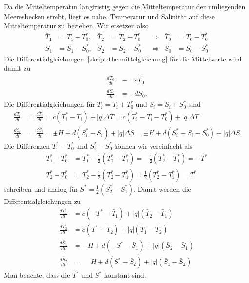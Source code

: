 Da die Mitteltemperatur langfristig gegen die Mitteltemperatur der
umliegenden Meeresbecken strebt, liegt es nahe, Temperatur und
Salinität auf diese Mitteltemperatur zu beziehen.
Wir ersetzen also
\begin{equation}
\begin{aligned}
\bar T_1&=T_1-T_0^*,
&
\bar T_2&=T_2-T_0^*
&&\Rightarrow&
\bar T_0&=T_0-T_0^*
\\
\bar S_1&=S_1-S_0^*,
&
\bar S_2&=S_2-S_0^*
&&\Rightarrow&
\bar S_0&=S_0-S_0^*
\end{aligned}
\end{equation}
Die Differentialgleichungen~\eqref{skript:thc:mittelgleichung}
für die Mittelwerte wird damit zu
\begin{align*}
\frac{d\bar T_0}{dt} &= -c \bar T_0\\
\frac{d\bar S_0}{dt} &= -d \bar S_0.
\end{align*}
Die Differentialgleichungen für
$T_i=\bar T_i + T_0^*$
und
$S_i=\bar S_i + S_0^*$
sind
\begin{align*}
\frac{dT_i}{dt}
&=
\frac{d\bar T_i}{dt}
=
c(T_i^*-T_i)
+ |q|\Delta \bar T
=
c(T_i^*- \bar T_i - T_0^*)
+ |q|\Delta \bar T
\\
\frac{dS_i}{dt}
&=
\frac{d\bar S_i}{dt}
=
\pm H
+
d(S_i^*-S_i)
+ |q|\Delta \bar S
=
\pm H
+
d(S_i^*- \bar S_i - S_0^*)
+ |q|\Delta \bar S
\end{align*}
Die Differenzen $T_i^*-T_0^*$ und $S_i^*-S_0^*$ können wir vereinfacht
als
\begin{align*}
T_1^*-T_0^* 
&=
T_1^* - \frac12(T_2^*-T_1^*)
=
-\frac12(T_2^*-T_1^*)
=
-T^*
\\
T_2^*-T_0^*
&=
T_2^*-\frac12(T_2^*-T_1^*)
=
\frac12(T_2^*-T_1^*)
=
T^*
\end{align*}
schreiben und analog für $S^*=\frac12(S_2^*-S_1^*)$.
Damit werden die Differentialgleichungen zu
\begin{equation}
\begin{aligned}
\frac{d\bar T_1}{dt}
&=
c(-T^*-\bar T_1) + |q| (\bar T_2-\bar T_1)
\\
\frac{d\bar T_2}{dt}
&=
c(T^*-\bar T_2) + |q| (\bar T_1-\bar T_2)
\\
\frac{d\bar S_1}{dt}
&=
-H
+
d(-S^*-\bar S_1) + |q|(\bar S_2 - \bar S_1)
\\
\frac{d\bar S_2}{dt}
&=
\phantom{-}H
+
d(S^*-\bar S_2) + |q|(\bar S_1 - \bar S_2)
\end{aligned}
\label{skript:thc:anomaliegleichungen}
\end{equation}
Man beachte, dass die $T^*$ und $S^*$ konstant sind.

